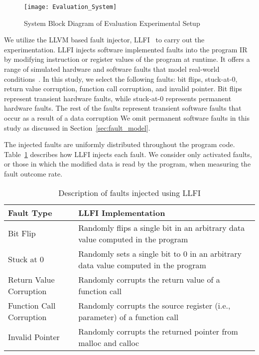 \begin{figure}[htbp]
  \centering
  \texttt{[image: Evaluation\_System]}
  \caption{System Block Diagram of Evaluation Experimental Setup}
  \label{fig:evaluation_sys}
\end{figure}


We utilize the LLVM based fault injector, LLFI~\cite{LLFI} to carry out the experimentation.
LLFI injects software implemented faults into the program IR by modifying instruction or register values of the program at runtime.
It offers a range of simulated hardware and software faults that model real-world conditions~\cite{V2005}.
In this study, we select the following faults: bit flips, stuck-at-0, return value corruption, function call corruption, and invalid pointer.
Bit flips represent transient hardware faults, while stuck-at-0 represents permanent hardware faults. 
The rest of the faults represent transient software faults that occur as a result of a data corruption
We omit permanent software faults in this study as discussed in Section~\ref{sec:fault_model}.

The injected faults are uniformly distributed throughout the program code.
Table~\ref{tab:faulttypes} describes how LLFI injects each fault.
We consider only activated faults, or those in which the modified data is read by the program, when measuring the fault outcome rate.


\begin{table}[htbp]
\small{
\begin{center}
    \begin{tabular}{|p{3cm}|p{5cm}|}
    \hline
    \textbf{Fault Type} & \textbf{LLFI Implementation} \\ \hline
    Bit Flip & Randomly flips a single bit in an arbitrary data value computed in the program  \\ \hline
    Stuck at 0 & Randomly sets a single bit to 0 in an arbitrary data value computed in the program  \\ \hline
    Return Value Corruption & Randomly corrupts the return value of a function call \\ \hline
    Function Call Corruption & Randomly corrupts the source register (i.e., parameter) of a function call \\ \hline
    Invalid Pointer & Randomly corrupts the returned pointer from malloc and calloc\\ \hline
    \hline
    \end{tabular}
    \end{center}
    }
    \caption{Description of faults injected using LLFI}
    \label{tab:faulttypes}
\end{table}
 

